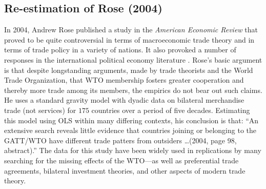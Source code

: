 \subsection{Re-estimation of Rose (2004)}

\nocite{rose:2004}
In 2004, Andrew Rose published a study in the \textit{American Economic Review} that proved to be quite controversial in terms of macroeconomic trade theory and in terms of trade policy in a variety of nations. It also provoked a number of responses in the international political economy literature \citep{tomz:etal:2007,ward:etal:2013}.  Rose's basic argument is that despite longstanding arguments, made by trade theorists and the World Trade Organization, that WTO membership fosters greater cooperation and thereby more trade among its members, the empirics do not bear out such claims. He uses a standard gravity model with dyadic data on bilateral merchandise trade (not services) for $175$ countries over a period of five decades. Estimating this model using OLS within many differing contexts, his conclusion is that: ``An extensive search reveals little evidence that countries joining or belonging to the GATT/WTO have different trade patters from outsiders \ldots (2004, page 98, abstract).''  The data for this study have been widely used in replications by many searching for the missing effects of the WTO---as well as preferential trade agreements, bilateral investment theories, and other aspects of modern trade theory.  

